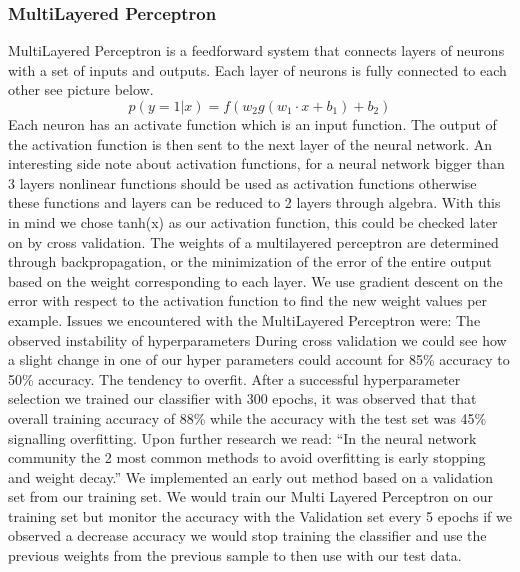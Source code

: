 \documentclass[11pt]{article}
\begin{document}
\subsubsection{MultiLayered Perceptron}
MultiLayered Perceptron is a feedforward system that connects layers of neurons with a set of inputs and outputs.  Each layer of neurons is fully connected to each other see picture below.
\begin{equation}
  p(y = 1 | x)
    =
      f(w_2 g(w_1 \cdot x + b_1) + b_2)
\end{equation}
Each neuron has an activate function which is an input function.  The output of the activation function is then sent to the next layer of the neural network.  An interesting side note about activation functions, for a neural network bigger than 3 layers nonlinear functions should be used as activation functions otherwise these functions and layers can be reduced to 2 layers through algebra.  With this in mind we chose tanh(x) as our activation function, this could be checked later on by cross validation. The weights of a multilayered perceptron are determined through backpropagation, or the minimization of the error of the entire output based on the weight corresponding to each layer.  We use gradient descent on the error with respect to the activation function to find the new weight values per example.
Issues we encountered with the MultiLayered Perceptron were:
The observed instability of hyperparameters
During cross validation we could see how a slight change in one of our hyper parameters could account for 85\% accuracy to 50\% accuracy.
The tendency to overfit.
After a successful hyperparameter selection we trained our classifier with 300 epochs, it was observed that that overall training accuracy of 88\% while the accuracy with the test set was 45\% signalling overfitting.  Upon further research we read: ``In the neural network community the 2 most common methods to avoid overfitting is early stopping and weight decay.''
We implemented an early out method based on a validation set from our training set.  We would train our Multi Layered Perceptron on our training set but monitor the accuracy with the Validation set every 5 epochs if we observed a decrease accuracy we would stop training the classifier and use the previous weights from the previous sample to then use with our test data.
\end{document}
